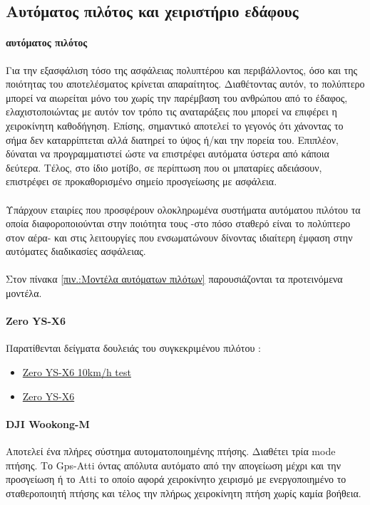 \documentclass[a4paper, 12pt, twoside]{report}
\begin{document}
{{{{{{		\subsection{Αυτόματος πιλότος και χειριστήριο εδάφους}
			\paragraph{αυτόματος πιλότος}{Για την εξασφάλιση τόσο της ασφάλειας πολυπτέρου και περιβάλλοντος, όσο και της ποιότητας του αποτελέσματος κρίνεται απαραίτητος. Διαθέτοντας αυτόν, το πολύπτερο μπορεί να αιωρείται μόνο του χωρίς την παρέμβαση του ανθρώπου από το έδαφος, ελαχιστοποιώντας με αυτόν τον τρόπο τις αναταράξεις που μπορεί να επιφέρει η χειροκίνητη καθοδήγηση. Επίσης, σημαντικό αποτελεί το γεγονός ότι χάνοντας το σήμα δεν καταρρίπτεται αλλά διατηρεί το ύψος ή/και την πορεία του. Επιπλέον, δύναται να προγραμματιστεί ώστε να επιστρέφει αυτόματα ύστερα από κάποια δεύτερα. Τέλος, στο ίδιο μοτίβο, σε περίπτωση που οι μπαταρίες αδειάσουν, επιστρέφει σε προκαθορισμένο σημείο προσγείωσης με ασφάλεια.
			}
			\paragraph{}{Υπάρχουν εταιρίες που προσφέρουν ολοκληρωμένα συστήματα αυτόματου πιλότου τα οποία διαφοροποιούνται στην ποιότητα τους -στο πόσο σταθερό είναι το πολύπτερο στον αέρα- και στις λειτουργίες που ενσωματώνουν δίνοντας ιδιαίτερη έμφαση στην αυτόματες διαδικασίες ασφάλειας.
			}
			\paragraph{}{Στον πίνακα \ref{πιν.:Μοντέλα αυτόματων πιλότων} παρουσιάζονται τα προτεινόμενα μοντέλα.
			}
			
			\paragraph{Zero YS-X6}{Παρατίθενται δείγματα δουλειάς του συγκεκριμένου πιλότου :
				\begin{itemize}
					\item \href{http://www.youtube.com/watch?v=r1_O_VvFZ1U}{Zero YS-X6 10km/h test}
					\item \href{http://www.youtube.com/watch?v=JRiiGby-e-4}{Zero YS-X6}					
				\end{itemize}
			}
			
			\paragraph{DJI Wookong-M}{Αποτελεί ένα πλήρες σύστημα αυτοματοποιημένης πτήσης. Διαθέτει τρία mode πτήσης. Το Gps-Atti όντας απόλυτα αυτόματο από την απογείωση μέχρι και την προσγείωση ή το Atti το οποίο αφορά χειροκίνητο χειρισμό με ενεργοποιημένο το σταθεροποιητή πτήσης και τέλος την πλήρως χειροκίνητη πτήση χωρίς καμία βοήθεια.
			}
}}}}}}
\end{document}
